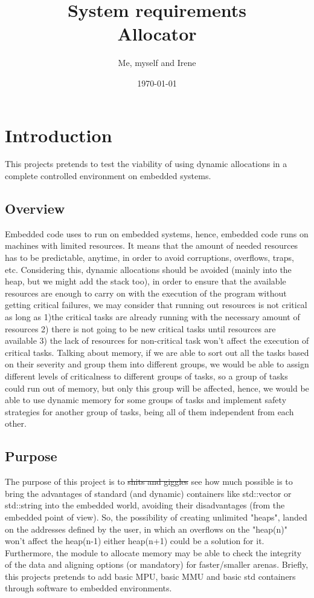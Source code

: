 \documentclass[a4paper,11pt]{article}
\title{System requirements \\
\large Allocator }
\author{ Me, myself and Irene  }
\date{\today}
\begin{document}
\maketitle
\newpage
\begin{versionhistory}
\end{versionhistory}
\setcounter{tocdepth}{4}
\setcounter{secnumdepth}{4}
\newpage
\tableofcontents{}
\listoffigures 
\listoftables
\printnoidxglossary[type=acronym]
\newpage


\section{Introduction}
This projects pretends to test the viability of using dynamic allocations in a complete controlled environment on embedded systems.
\subsection{Overview}
Embedded code uses to run on embedded systems, hence, embedded code runs on machines with limited resources. It means that the amount of needed resources has to be predictable, anytime, in order to avoid corruptions, overflows, traps, etc.
Considering this, dynamic allocations should be avoided (mainly into the heap, but we might add the stack too), in order to ensure that the available resources are enough to carry on with the execution of the program without getting critical failures, we may consider that running out resources is not critical  as long as 1)the critical tasks are already running with the necessary amount of resources 2) there is not going to be new critical tasks until resources are available 3) the lack of resources for non-critical task won't affect the execution of critical tasks.
Talking about memory, if we are able to sort out all the tasks based on their severity and group them into different groups, we would be able to assign different levels of criticalness to different groups of tasks, so a group of tasks could run out of memory, but only this group will be affected, hence, we would be able to use dynamic memory for some groups of tasks and implement safety strategies for another group of tasks, being all of them independent from each other.
\subsection{Purpose}
The purpose of this project is to \sout{shits and giggles} see how much possible is to bring the advantages of standard (and dynamic) containers like std::vector or std::string into the embedded world, avoiding their disadvantages (from the embedded point of view). So, the possibility of creating unlimited "heaps", landed on the addresses defined by the user, in which an overflows on the "heap(n)" won't affect the heap(n-1) either heap(n+1) could be a solution for it. Furthermore, the module to allocate memory may be able to check the integrity of the data and aligning options (or mandatory) for faster/smaller arenas.
Briefly, this projects pretends to add basic MPU, basic MMU and basic std containers through software to embedded environments.
\end{document}
